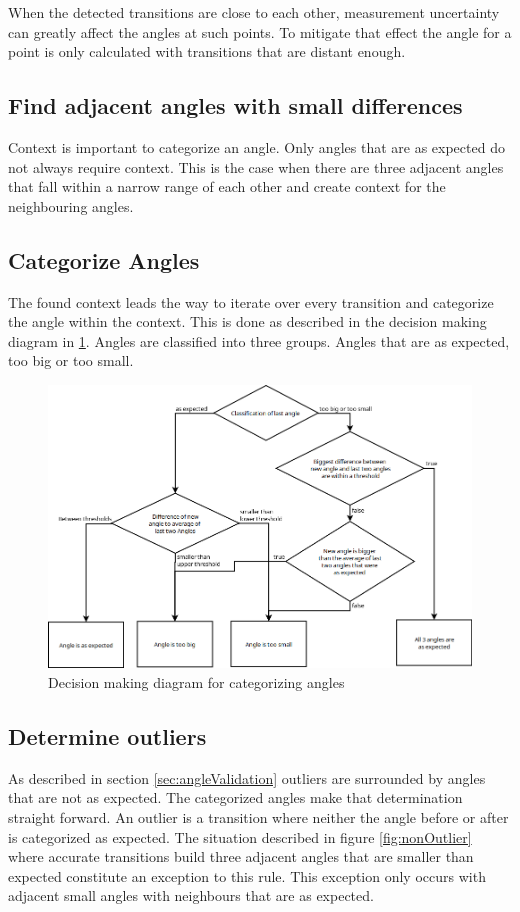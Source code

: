 When the detected transitions are close to each other, measurement uncertainty can greatly affect the angles at such points. To mitigate that effect the angle for a point is only calculated with transitions that are distant enough.
\subsection{Find adjacent angles with small differences}
Context is important to categorize an angle. Only angles that are as expected do not always require context. This is the case when there are three adjacent angles that fall within a narrow range of each other and create context for the neighbouring angles.

\subsection{Categorize Angles}
The found context leads the way to iterate over every transition and categorize the angle within the context. This is done as described in the decision making diagram in \ref{fig:decisionMaking}. Angles are classified into three groups. Angles that are as expected, too big or too small. 

\begin{figure}[H]
	\centering
	\includegraphics[width=.9\linewidth]{images/angleclassification.png}
	\caption{Decision making diagram for categorizing angles}
	\label{fig:decisionMaking}
\end{figure}
\subsection{Determine outliers}
As described in section \ref{sec:angleValidation} outliers are surrounded by angles that are not as expected. The categorized angles make that determination straight forward. An outlier is a transition where neither the angle before or after is categorized as expected. 
The situation described in figure \ref{fig:nonOutlier} where accurate transitions build three adjacent angles that are smaller than expected constitute an exception to this rule. This exception only occurs with adjacent small angles with neighbours that are as expected. 
